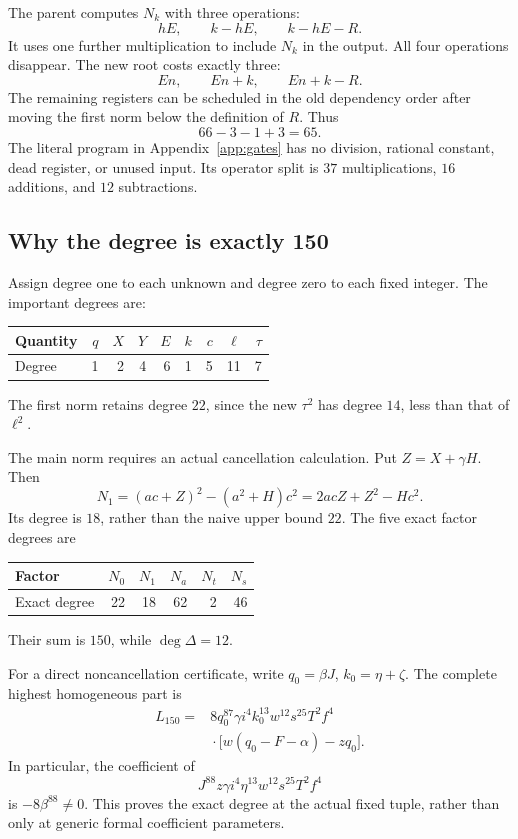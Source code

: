 \documentclass[11pt,letterpaper]{article}
\theoremstyle{definition}
\begin{document}
The parent computes \(N_k\) with three operations:
\[
 hE,\qquad k-hE,\qquad k-hE-R.
\]
It uses one further multiplication to include \(N_k\) in the output.
All four operations disappear. The new root costs exactly three:
\[
 En,\qquad En+k,\qquad En+k-R.
\]
The remaining registers can be scheduled in the old dependency order
after moving the first norm below the definition of \(R\). Thus
\[
 66-3-1+3=\boxed{65}.
\]
The literal program in Appendix~\ref{app:gates} has no division, rational
constant, dead register, or unused input. Its operator split is
\(37\) multiplications, \(16\) additions, and \(12\) subtractions.

\subsection{Why the degree is exactly 150}

Assign degree one to each unknown and degree zero to each fixed integer.
The important degrees are:
\begin{center}
\begin{tabular}{lrrrrrrrr}
\toprule
Quantity & \(q\)&\(X\)&\(Y\)&\(E\)&\(k\)&\(c\)&\(\ell\)&\(\tau\)\\
\midrule
Degree &1&2&4&6&1&5&11&7\\
\bottomrule
\end{tabular}
\end{center}
The first norm retains degree \(22\), since the new \(\tau^2\) has
degree \(14\), less than that of \(\ell^2\).

The main norm requires an actual cancellation calculation. Put
\(Z=X+\gamma H\). Then
\begin{equation}\label{eq:n1cancel}
 N_1=(ac+Z)^2-(a^2+H)c^2
       =2acZ+Z^2-Hc^2.
\end{equation}
Its degree is \(18\), rather than the naive upper bound \(22\).
The five exact factor degrees are
\begin{center}
\begin{tabular}{lrrrrr}
\toprule
Factor & \(N_0\)&\(N_1\)&\(N_a\)&\(N_t\)&\(N_s\)\\
\midrule
Exact degree &22&18&62&2&46\\
\bottomrule
\end{tabular}
\end{center}
Their sum is \(150\), while \(\deg\Delta=12\).

For a direct noncancellation certificate, write
\(q_0=\beta J\), \(k_0=\eta+\zeta\). The complete highest homogeneous
part is
\begin{equation}\label{eq:leader}
\begin{split}
 L_{150}={}&8q_0^{87}\gamma i^4 k_0^{13}w^{12}s^{25}T^2f^4\\
 &{}\cdot\bigl[w(q_0-F-\alpha)-zq_0\bigr].
\end{split}
\end{equation}
In particular, the coefficient of
\[
 J^{88}z\gamma i^4\eta^{13}w^{12}s^{25}T^2f^4
\]
is \(-8\beta^{88}\ne0\). This proves the exact degree at the actual
fixed tuple, rather than only at generic formal coefficient parameters.
\end{document}
